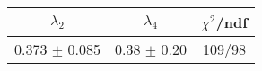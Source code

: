 \begin{tabular}{c|c||c}
$\lambda_{2}$ & $\lambda_4$ & $\chi^{2}$/ndf \\
\hline
0.373 $\pm$ 0.085 & 0.38 $\pm$ 0.20 & 109/98\\
\end{tabular}
